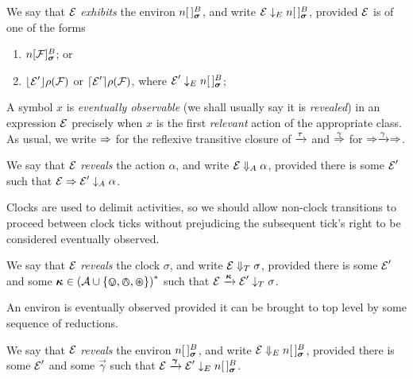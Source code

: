\documentclass[orivec,envcountsame]{llncs}
\begin{document}
\begin{definition}
We say that $\text{$\mathcal{E}$}$ \emph{exhibits} the environ $\locv{n}{\,}{B}{\vec{\sigma}}$,
and write $\expr \ExhibitsE \locv{n}{\,}{B}{\vec{\sigma}}$, provided $\text{$\mathcal{E}$}$ is 
of one of the forms

\begin{enumerate}
\item
    $\locv{n}{\exprb}{B}{\vec{\sigma}}$; or
\item
    $\lfloor{\text{$\mathcal{E}$}' }\rfloor {\rho} ({\text{$\mathcal{F}$}})$ or $\lceil{\text{$\mathcal{E}$}' }\rceil {\rho} ({\text{$\mathcal{F}$}})$,
    where $\expr' \ExhibitsE \locv{n}{\,}{B}{\vec{\sigma}}$;
\end{enumerate}
\end{definition}


A symbol $x$ is \emph{eventually observable} (we shall usually say it
is \emph{revealed}) in an expression $\text{$\mathcal{E}$}$ precisely when $x$ is the
first \emph{relevant} action of the appropriate class. As usual, we
write $\mathrel{\Rightarrow}$ for the reflexive transitive closure of $\xrightarrow{\tau}$ and 
$\stackrel{\gamma}{\Rightarrow}$ for $\mathrel{\Rightarrow}\xrightarrow{\gamma}\mathrel{\Rightarrow}$.

\begin{definition}
We say that $\text{$\mathcal{E}$}$ \emph{reveals} the action $\alpha$, and write $\text{$\mathcal{E}$}
\mathrel{\Downarrow_{A}} \alpha$, provided there is some $\text{$\mathcal{E}$}'$ such that $\text{$\mathcal{E}$}
\mathrel{\Rightarrow} \text{$\mathcal{E}$}' \mathrel{\downarrow_{A}} \alpha$.
\end{definition}

Clocks are used to delimit activities, so we should allow non-clock transitions
to proceed between clock ticks without prejudicing the subsequent tick's
right to be considered eventually observed.

\begin{definition}
We say that $\text{$\mathcal{E}$}$ \emph{reveals} the clock $\sigma$, and write $\text{$\mathcal{E}$}
\mathrel{\Downarrow_{T}} \sigma$, provided there is some $\text{$\mathcal{E}$}'$ and some $\vec{\kappa} \in
\left( \actions \cup \{ \tin, \tout, \topen \}\right)^*$ such that $\expr
\Does{\vec{\kappa}} \expr' \ExhibitsT \sigma$.
\end{definition}

An environ is eventually observed provided it can be brought to top
level by some sequence of reductions.

\begin{definition}

We say that $\text{$\mathcal{E}$}$ \emph{reveals} the environ $\locv{n}{\,}{B}{\vec{\sigma}}$,
and write $\expr \RevealsE \locv{n}{\,}{B}{\vec{\sigma}}$, provided there is
some $\text{$\mathcal{E}$}'$ and some $\vec{\gamma}$ such that $\expr \Does{\vec{\gamma}}
\expr' \ExhibitsE \locv{n}{\,}{B}{\vec{\sigma}}$.

\end{definition}
\end{document}
